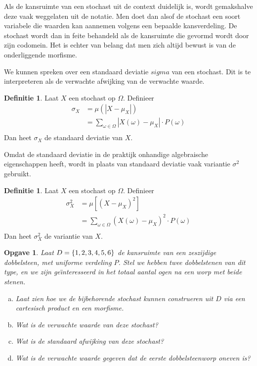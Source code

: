 \documentclass[a4paper]{book}
\newtheorem{exercise}[theorem]{Opgave}
\theoremstyle{definition}
\newtheorem{definition}[theorem]{Definitie}
\begin{document}
Als de kansruimte van een stochast uit de context duidelijk is, wordt gemakshalve deze vaak weggelaten uit de notatie.
Men doet dan alsof de stochast een soort variabele die waarden kan aannemen volgens een bepaalde kansverdeling.
De stochast wordt dan in feite behandeld als de kansruimte die gevormd wordt door zijn codomein.
Het is echter van belang dat men zich altijd bewust is van de onderliggende morfisme.


We kunnen spreken over een standaard deviatie $sigma$ van een stochast. Dit is te interpreteren als de verwachte afwijking van de verwachte waarde.

\begin{definition}
    Laat $X$ een stochast op $\Omega$.
    Definieer
    \begin{align*}
        \sigma_X &= \mu( |X - \mu_X| ) \\
                  &= \sum_{\omega \in \Omega} |X(\omega) - \mu_X| \cdot P(\omega) \\
    \end{align*}
    Dan heet $\sigma_X$ de standaard deviatie van $X$.
\end{definition}

Omdat de standaard deviatie in de praktijk onhandige algebraische eigenschappen heeft, wordt in plaats van standaard deviatie vaak variantie
$\sigma^2$ gebruikt.

\begin{definition}
    Laat $X$ een stochast op $\Omega$.
    Definieer
    \begin{align*}
        \sigma^2_X &= \mu[ {(X - \mu_X)}^2 ] \\
                    &= \sum_{\omega \in \Omega} {(X(\omega) - \mu_X)}^2 \cdot P(\omega) \\
    \end{align*}
    Dan heet $\sigma^2_X$ de variantie van $X$.
\end{definition}

\begin{exercise}
    Laat $D = \set{1,2,3,4,5,6}$ de kansruimte van een zeszijdige dobbelsteen, met uniforme verdeling $P$.
    Stel we hebben twee dobbelstenen van dit type, en we zijn ge\"{\i}nteresseerd in het totaal aantal ogen na een worp met beide stenen.
    \begin{enumerate}[a.]
    \item Laat zien hoe we de bijbehorende stochast kunnen construeren uit $D$ via een cartesisch product en een morfisme.
    \item Wat is de verwachte waarde van deze stochast?
    \item Wat is de standaard afwijking van deze stochast?
    \item Wat is de verwachte waarde gegeven dat de eerste dobbelsteenworp oneven is?
    \end{enumerate}
\end{exercise}
\end{document}
